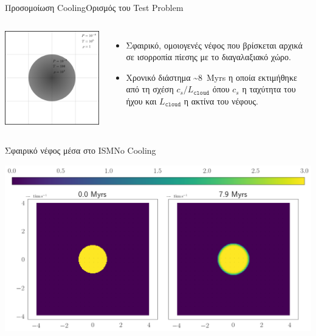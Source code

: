 \documentclass{beamer}
\begin{document}
\begin{frame}{Προσομοίωση Cooling}{Ορισμός του Test Problem}
	
\begin{columns}
	\begin{center}
		\includegraphics[width=1\linewidth]{../Document/Images/rect4578}
	\end{center}
	
	\begin{itemize}
		\item{Σφαιρικό, ομοιογενές νέφος που βρίσκεται αρχικά σε ισορροπία πίεσης με το διαγαλαξιακό χώρο.}
		\item{Χρονικό διάστημα \SI{~8}{Myrs} η οποία εκτιμήθηκε από τη σχέση $c_s/L_\mathtt{cloud}$ όπου $c_s$ η ταχύτητα του ήχου και $L_\mathtt{cloud}$ η ακτίνα του νέφους. }
	\end{itemize}
\end{columns}
\end{frame}

\begin{frame}{Σφαιρικό νέφος μέσα στο ISM}{No Cooling}
\begin{center}
	\includegraphics[width=1\linewidth]{../Document/DataImages/NoCoolingRHOquad}
\end{center}
\end{frame}
\end{document}

